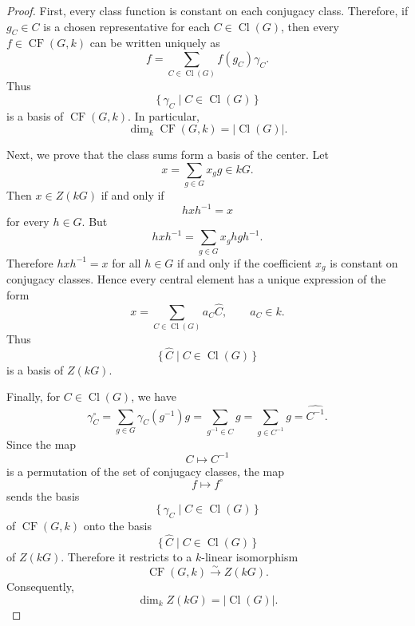 \begin{proof}
    First, every class function is constant on each conjugacy class. Therefore, if
    \(g_C\in C\) is a chosen representative for each \(C\in \operatorname{Cl}(G)\),
    then every \(f\in \operatorname{CF}(G,k)\) can be written uniquely as
    \[
        f
        =
        \sum_{C\in \operatorname{Cl}(G)} f(g_C)\gamma_C.
    \]
    Thus
    \[
        \{\,\gamma_C\mid C\in \operatorname{Cl}(G)\,\}
    \]
    is a basis of \(\operatorname{CF}(G,k)\). In particular,
    \[
        \dim_k\operatorname{CF}(G,k)=|\operatorname{Cl}(G)|.
    \]

    Next, we prove that the class sums form a basis of the center. Let
    \[
        x=\sum_{g\in G}x_g g\in kG.
    \]
    Then \(x\in Z(kG)\) if and only if
    \[
        hxh^{-1}=x
    \]
    for every \(h\in G\). But
    \[
        hxh^{-1}
        =
        \sum_{g\in G}x_g hgh^{-1}.
    \]
    Therefore \(hxh^{-1}=x\) for all \(h\in G\) if and only if the coefficient
    \(x_g\) is constant on conjugacy classes. Hence every central element has a
    unique expression of the form
    \[
        x
        =
        \sum_{C\in \operatorname{Cl}(G)} a_C \widehat{C},
        \qquad a_C\in k.
    \]
    Thus
    \[
        \{\,\widehat{C}\mid C\in \operatorname{Cl}(G)\,\}
    \]
    is a basis of \(Z(kG)\).

    Finally, for \(C\in \operatorname{Cl}(G)\), we have
    \[
        \gamma_C^\circ
        =
        \sum_{g\in G}\gamma_C(g^{-1})g
        =
        \sum_{g^{-1}\in C}g
        =
        \sum_{g\in C^{-1}}g
        =
        \widehat{C^{-1}}.
    \]
    Since the map
    \[
        C\longmapsto C^{-1}
    \]
    is a permutation of the set of conjugacy classes, the map
    \[
        f\longmapsto f^\circ
    \]
    sends the basis
    \[
        \{\,\gamma_C\mid C\in \operatorname{Cl}(G)\,\}
    \]
    of \(\operatorname{CF}(G,k)\) onto the basis
    \[
        \{\,\widehat{C}\mid C\in \operatorname{Cl}(G)\,\}
    \]
    of \(Z(kG)\). Therefore it restricts to a \(k\)-linear isomorphism
    \[
        \operatorname{CF}(G,k)
        \xrightarrow{\sim}
        Z(kG).
    \]
    Consequently,
    \[
        \dim_k Z(kG)=|\operatorname{Cl}(G)|.
    \]
\end{proof}
